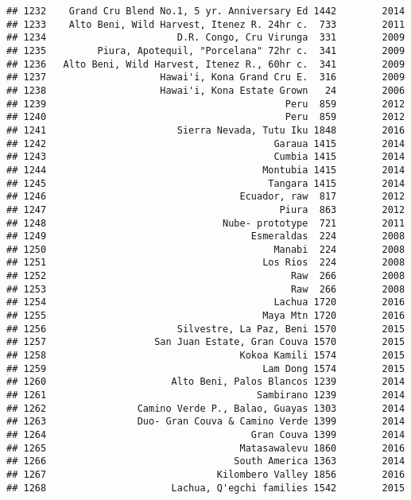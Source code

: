\documentclass[
]{article}
\begin{document}
\begin{verbatim}
## 1232    Grand Cru Blend No.1, 5 yr. Anniversary Ed 1442        2014
## 1233    Alto Beni, Wild Harvest, Itenez R. 24hr c.  733        2011
## 1234                       D.R. Congo, Cru Virunga  331        2009
## 1235         Piura, Apotequil, "Porcelana" 72hr c.  341        2009
## 1236   Alto Beni, Wild Harvest, Itenez R., 60hr c.  341        2009
## 1237                    Hawai'i, Kona Grand Cru E.  316        2009
## 1238                    Hawai'i, Kona Estate Grown   24        2006
## 1239                                          Peru  859        2012
## 1240                                          Peru  859        2012
## 1241                       Sierra Nevada, Tutu Iku 1848        2016
## 1242                                        Garaua 1415        2014
## 1243                                        Cumbia 1415        2014
## 1244                                      Montubia 1415        2014
## 1245                                       Tangara 1415        2014
## 1246                                  Ecuador, raw  817        2012
## 1247                                         Piura  863        2012
## 1248                               Nube- prototype  721        2011
## 1249                                    Esmeraldas  224        2008
## 1250                                        Manabi  224        2008
## 1251                                      Los Rios  224        2008
## 1252                                           Raw  266        2008
## 1253                                           Raw  266        2008
## 1254                                        Lachua 1720        2016
## 1255                                      Maya Mtn 1720        2016
## 1256                       Silvestre, La Paz, Beni 1570        2015
## 1257                   San Juan Estate, Gran Couva 1570        2015
## 1258                                  Kokoa Kamili 1574        2015
## 1259                                      Lam Dong 1574        2015
## 1260                      Alto Beni, Palos Blancos 1239        2014
## 1261                                     Sambirano 1239        2014
## 1262                Camino Verde P., Balao, Guayas 1303        2014
## 1263                Duo- Gran Couva & Camino Verde 1399        2014
## 1264                                    Gran Couva 1399        2014
## 1265                                  Matasawalevu 1860        2016
## 1266                                 South America 1363        2014
## 1267                              Kilombero Valley 1856        2016
## 1268                      Lachua, Q'egchi families 1542        2015

\end{verbatim}
\end{document}
